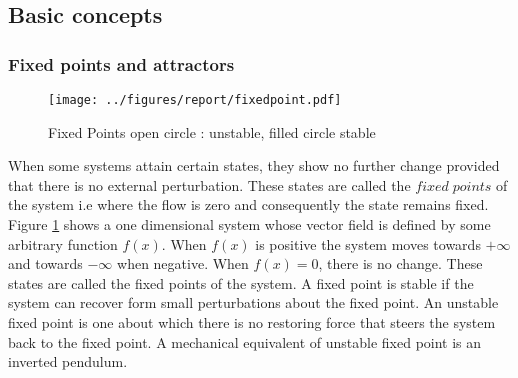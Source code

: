 \subsection{Basic concepts}
\subsubsection{Fixed points and attractors}
\begin{figure}
\centering
\texttt{[image: ../figures/report/fixedpoint.pdf]}
\caption{Fixed Points open circle : unstable, filled circle stable}
\label{fixedpt}
\end{figure}
When some systems attain certain states, they show no further change provided that there is no external perturbation. These states are called the $fixed \; points$ of the system i.e where the flow is zero and consequently the state remains fixed.  Figure \ref{fixedpt} shows a one dimensional system whose vector field is defined by some arbitrary function $f(x)$. When $f(x)$ is positive the system moves towards $+ \infty$ and towards $- \infty $ when negative. When $f(x) = 0$, there is no change. These states are called the fixed points of the system. A fixed point is stable if the system can recover form small perturbations about the fixed point.  An unstable fixed point is one about which there is no restoring force that steers the system back to the fixed point.  A mechanical equivalent of unstable fixed point is an inverted pendulum.



